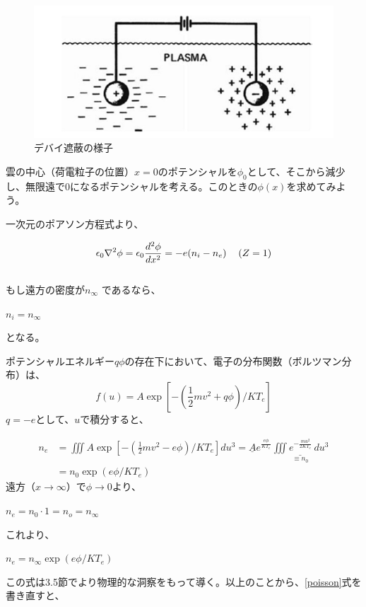 \documentclass{ltjsarticle}
\numberwithin{equation}{section} %
\begin{document}
\begin{figure}[htbp]
  \centering
  \includegraphics[width=0.7\linewidth]{debye.png}
  \caption{デバイ遮蔽の様子}
  \label{fig.debye}
\end{figure}


雲の中心（荷電粒子の位置）$x=0$のポテンシャルを$\phi _0$として、そこから減少し、無限遠で0になるポテンシャルを考える。このときの$\phi (x)$を求めてみよう。

一次元のポアソン方程式より、

\begin{equation}
  \epsilon_0 \nabla^2 \phi = \epsilon_0 \frac{d^2\phi}{dx^2} = -e(n_i - n_e) \hspace{1pc}  (Z=1) \label{poisson}
\end{equation}
\\
もし遠方の密度が$n_\infty$ であるなら、
\begin{center}
  $n_i = n_\infty$
\end{center}
となる。

ポテンシャルエネルギー$q\phi$の存在下において、電子の分布関数（ボルツマン分布）は、
\begin{equation}
  f(u) = A\exp[-\left(\frac{1}{2}mv^2 + q\phi\right)/KT_e]
\end{equation}
$q=-e$として、$u$で積分すると、

\begin{align}
  n_e &= \iiint A\exp[-\left(\frac{1}{2}mv^2 - e\phi\right)/KT_e]du^3 = \underline{A}e^{\frac{e\phi}{K T_e}} 
\underset{\equiv n_0}{\underline{\iiint e^{-\frac{m u^2}{2 K T_e}} \, du^3}}\\
       &= n_0 \exp(e\phi/KT_e)
\end{align}
遠方（$x\to \infty$）で$\phi \to 0$より、
\begin{center}
  $n_e = n_0\cdot 1 = n_o = n_\infty$
\end{center}
これより、

\begin{center}
 $n_e =  n_\infty \exp(e\phi/KT_e)$
\end{center}
この式は3.5節でより物理的な洞察をもって導く。以上のことから、\eqref{poisson}式を書き直すと、
\end{document}
